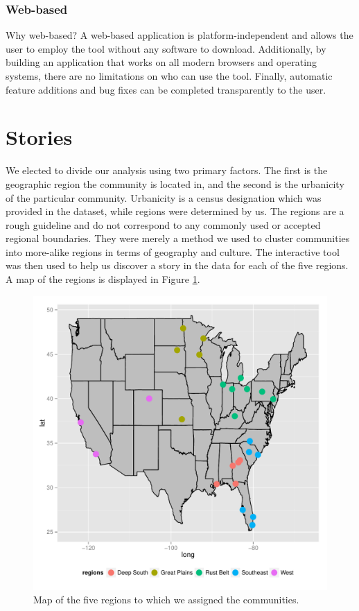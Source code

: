 \documentclass[11pt]{article}\usepackage{knitr}
\begin{document}
\subsubsection*{Web-based}
Why web-based? A web-based application is platform-independent and allows the user to employ the tool without any software to download. Additionally, by building an application that works on all modern browsers and operating systems, there are no limitations on who can use the tool. Finally, automatic feature additions and bug fixes can be completed transparently to the user.


\section*{Stories}

We elected to divide our analysis using two primary factors. The first is the geographic region the community is located in, and the second is the urbanicity of the particular community. Urbanicity is a census designation which was provided in the dataset, while regions were determined by us. The regions are a rough guideline and do not correspond to any commonly used or accepted regional boundaries. They were merely a method we used to cluster communities into more-alike regions in terms of geography and culture. The interactive tool was then used to help us discover a story in the data for each of the five regions. A map of the regions is displayed in Figure \ref{fig:region_map}.

\begin{knitrout}
\color{fgcolor}\begin{figure}[H]

\includegraphics[width=\maxwidth]{figure/region_map} \caption[Map of the five regions to which we assigned the communities]{Map of the five regions to which we assigned the communities.\label{fig:region_map}}
\end{figure}


\end{knitrout}
\end{document}
